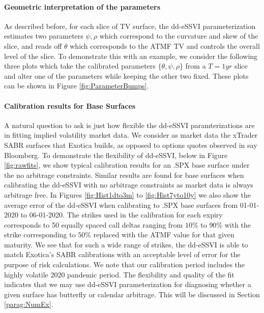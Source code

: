 \documentclass[11pt,letterpaper]{article}
\begin{document}
\paragraph{Geometric interpretation of the parameters}
As described before, for each slice of TV surface, the dd-eSSVI parameterization estimates two parameters $\psi, \rho$ which correspond to the curvature and skew of the slice, and reads off $\theta$ which corresponds to the ATMF TV and controls the overall level of the slice. To demonstrate this with an example, we consider the following three plots which take the calibrated parameters $\{\theta, \psi, \rho  \}$ from a $T = 1 yr$ slice and alter one of the parameters while keeping the other two fixed. These plots can be shown in Figure \ref{fig:ParameterBumps}.


%
%


\paragraph{Calibration results for Base Surfaces}
A natural question to ask is just how flexible the dd-eSSVI paramterizations are in fitting implied volatility market data. We consider as market data the xTrader SABR surfaces that Exotica builds, as opposed to options quotes observed in say Bloomberg. To demonstrate the flexibility of dd-eSSVI, below in Figure \ref{fig:rawfits}, we show typical calibration results for an .SPX base surface under the no arbitrage constraints. Similar results are found for base surfaces when calibrating the dd-eSSVI with no arbitrage constraints as market data is always arbitrage free. In Figures \ref{fig:Hist1dto3m} to \ref{fig:Hist7yto10y} we also show the average error of the dd-eSSVI when calibrating to .SPX base surfaces from 01-01-2020 to 06-01-2020. The strikes used in the calibration for each expiry corresponds to 50 equally spaced call deltas ranging from $10\%$ to $90\%$ with the strike corresponding to $50\%$ replaced with the ATMF value for that given maturity. We see that for such a wide range of strikes, the dd-eSSVI is able to match Exotica's SABR calibrations with an acceptable level of error for the purpose of risk calculations. We note that our calibration period includes the highly volatile 2020 pandemic period. The flexibility and quality of the fit indicates that we may use dd-eSSVI parameterization for diagnosing whether a given surface has butterfly or calendar arbitrage. This will be discussed in Section \ref{parag:NumEx}. 
\end{document}
